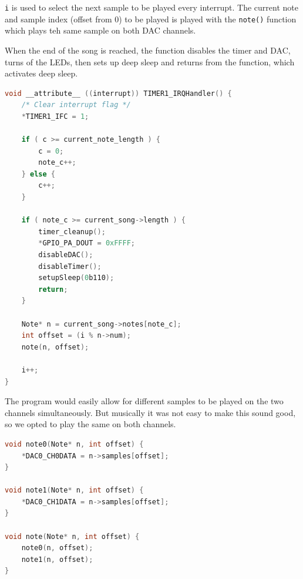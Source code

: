 \texttt{i} is used to select the next sample to be played every interrupt. The current note and sample index (offset from 0) to be played is played with the \texttt{note()} function which plays teh same sample on both DAC channels.

When the end of the song is reached, the function disables the timer and DAC, turns of the LEDs, then sets up deep sleep and returns from the function, which activates deep sleep.

\begin{minipage}{\linewidth}
\begin{lstlisting}[language=C, label=interrupt_handlers, caption=Timer interrupt handler from interrupt\_handlers.c]
void __attribute__ ((interrupt)) TIMER1_IRQHandler() {  
    /* Clear interrupt flag */
    *TIMER1_IFC = 1;

    if ( c >= current_note_length ) {
        c = 0;
        note_c++;
    } else {
        c++;
    }

    if ( note_c >= current_song->length ) {
        timer_cleanup();
        *GPIO_PA_DOUT = 0xFFFF;
        disableDAC();
        disableTimer();
        setupSleep(0b110);
        return;
    }

    Note* n = current_song->notes[note_c];
    int offset = (i % n->num);
    note(n, offset);

    i++;
}
\end{lstlisting}
\end{minipage}

\newpage
The program would easily allow for different samples to be played on the two channels simultaneously. But musically it was not easy to make this sound good, so we opted to play the same on both channels.

\begin{minipage}{\linewidth}
\begin{lstlisting}[language=C, label=interrupt_handlers, caption=Timer interrupt handler from interrupt\_handlers.c]
void note0(Note* n, int offset) {
    *DAC0_CH0DATA = n->samples[offset];
}

void note1(Note* n, int offset) {
    *DAC0_CH1DATA = n->samples[offset];
}

void note(Note* n, int offset) {
    note0(n, offset);
    note1(n, offset);
}
\end{lstlisting}
\end{minipage}
